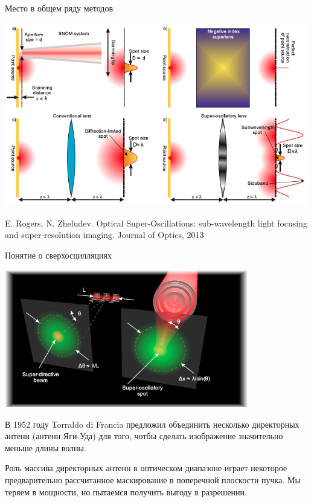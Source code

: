 \documentclass[9pt, compress, xcolor=table]{beamer}
\begin{document}

\begin{frame}{Место в общем ряду методов}
\begin{center}
\includegraphics[width=\textwidth]{nh1}
\end{center}

E. Rogers, N. Zheludev. Optical Super-Oscillations: sub-wavelength light focusing and super-resolution imaging. Journal of Optics, 2013
\end{frame}
\begin{frame}{Понятие о сверхосцилляциях}
\begin{center}
\includegraphics[width=0.8\textwidth]{nh2}
\end{center}

В 1952 году Torraldo di Francia предложил объединить несколько директорных антенн (антенн Яги-Уда) для того, чотбы сделать изображение значительно меньше длины волны. 

Роль массива директорных антенн в оптическом диапазоне играет некоторое предварительно рассчитанное маскирование в поперечной плоскости пучка. Мы теряем в мощности, но пытаемся получить выгоду в разрешении.
\end{frame}
\end{document}
